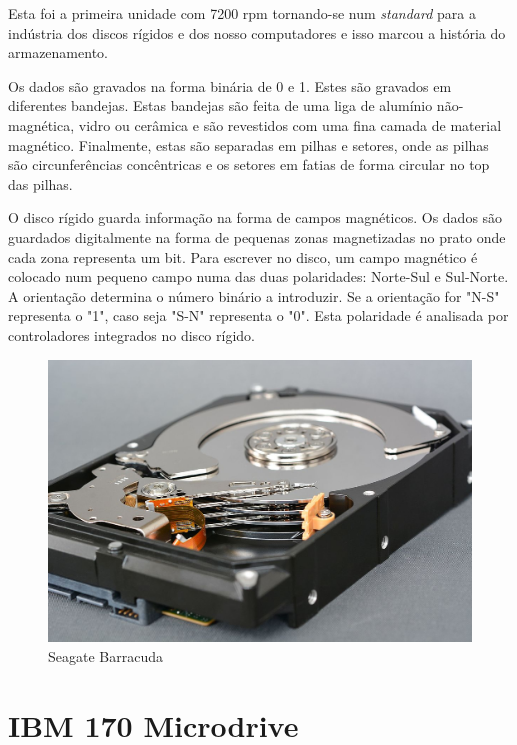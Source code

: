 \documentclass{report}
\begin{document}
	Esta foi a primeira unidade com 7200 rpm tornando-se num \textit{standard} para a indústria dos discos rígidos e dos nosso computadores e isso marcou a história do armazenamento.
\vspace{1mm}
	
	Os dados são gravados na forma binária de 0 e 1. Estes são gravados em diferentes bandejas. Estas bandejas são feita de uma liga de alumínio não-magnética, vidro ou cerâmica e são revestidos com uma fina camada de material magnético. Finalmente, estas são separadas em pilhas e setores, onde as pilhas são circunferências concêntricas e os setores em fatias de forma circular no top das pilhas.
\vspace{1mm}
	
	O disco rígido guarda informação na forma de campos magnéticos. Os dados são guardados digitalmente na forma de pequenas zonas magnetizadas no prato onde cada zona representa um bit. Para escrever no disco, um campo magnético é colocado num pequeno campo numa das duas polaridades: Norte-Sul e Sul-Norte. A orientação determina o número binário a introduzir. Se a orientação for "N-S" representa o "1", caso seja "S-N" representa o "0". Esta polaridade é analisada por controladores integrados no disco rígido.
\vspace{1mm}

	\begin{figure} [h]
		\centering
		\includegraphics[scale=0.7]{barracuda.jpg}
		\caption{Seagate Barracuda}
	\end{figure}
	
\newpage
	
		\section{IBM 170 Microdrive}
	
\end{document}
